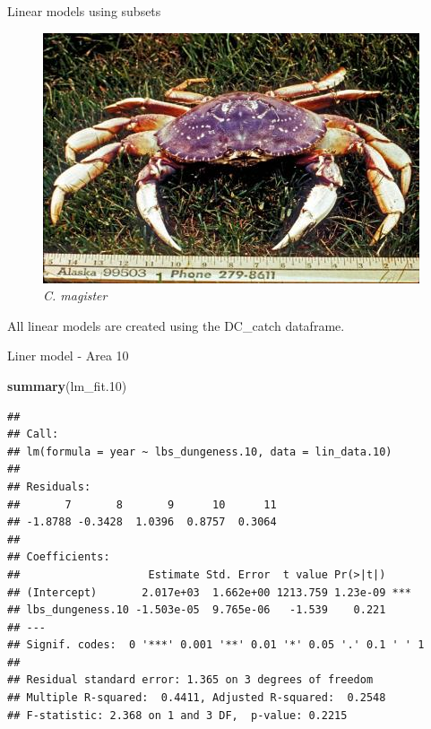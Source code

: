 \documentclass[ignorenonframetext,]{beamer}
\newenvironment{Shaded}{\begin{snugshade}}{\end{snugshade}}
\newcommand{\KeywordTok}[1]{\textcolor[rgb]{0.13,0.29,0.53}{\textbf{#1}}}
\newcommand{\DecValTok}[1]{\textcolor[rgb]{0.00,0.00,0.81}{#1}}
\newcommand{\NormalTok}[1]{#1}
\begin{document}
\begin{frame}{Linear models using subsets}

\begin{figure}
\centering
\includegraphics{../Images/dungeness_crab.jpg}
\caption{\emph{C. magister}}
\end{figure}

All linear models are created using the DC\_catch dataframe.

\end{frame}

\begin{frame}[fragile]{Liner model - Area 10}

\begin{Shaded}
\begin{Highlighting}[]
\KeywordTok{summary}\NormalTok{(lm_fit.}\DecValTok{10}\NormalTok{)}
\end{Highlighting}
\end{Shaded}

\begin{verbatim}
## 
## Call:
## lm(formula = year ~ lbs_dungeness.10, data = lin_data.10)
## 
## Residuals:
##       7       8       9      10      11 
## -1.8788 -0.3428  1.0396  0.8757  0.3064 
## 
## Coefficients:
##                    Estimate Std. Error  t value Pr(>|t|)    
## (Intercept)       2.017e+03  1.662e+00 1213.759 1.23e-09 ***
## lbs_dungeness.10 -1.503e-05  9.765e-06   -1.539    0.221    
## ---
## Signif. codes:  0 '***' 0.001 '**' 0.01 '*' 0.05 '.' 0.1 ' ' 1
## 
## Residual standard error: 1.365 on 3 degrees of freedom
## Multiple R-squared:  0.4411, Adjusted R-squared:  0.2548 
## F-statistic: 2.368 on 1 and 3 DF,  p-value: 0.2215
\end{verbatim}

\end{frame}
\end{document}
